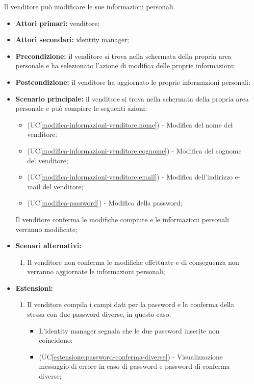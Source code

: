 Il venditore può modificare le sue informazioni personali.
\begin{itemize}
    \item \textbf{Attori primari:} venditore;
    \item \textbf{Attori secondari:} identity manager;
    \item \textbf{Precondizione:} il venditore si trova nella schermata della propria area personale e ha selezionato l'azione di modifica delle proprie informazioni;
    \item \textbf{Postcondizione:} il venditore ha aggiornato le proprie informazioni personali;
    \item \textbf{Scenario principale:} il venditore si trova nella schermata della propria area personale e può compiere le seguenti azioni:
    \begin{itemize}
    	\item (UC\ref{modifica-informazioni-venditore.nome}) - Modifica del nome del venditore;
    	\item (UC\ref{modifica-informazioni-venditore.cognome}) - Modifica del cognome del venditore;
        \item (UC\ref{modifica-informazioni-venditore.email}) - Modifica dell'indirizzo e-mail del venditore;
        \item (UC\ref{modifica-password}) - Modifica della password;
    \end{itemize}
    Il venditore conferma le modifiche compiute e le informazioni personali verranno modificate;
    \item \textbf{Scenari alternativi:}
    \begin{enumerate}[label=\lett]
    	\item Il venditore non conferma le modifiche effettuate e di conseguenza non verranno aggiornate le informazioni personali;
    \end{enumerate}
    \item \textbf{Estensioni:}
    \begin{enumerate}[label=\lett]
    	\item Il venditore compila i campi dati per la password e la conferma della stessa con due password diverse, in questo caso:
    	\begin{itemize}
    		\item L'identity manager segnala che le due password inserite non coincidono;
    		\item (UC\ref{estensione:password-conferma-diverse}) - Visualizzazione messaggio di errore in caso di password e password di conferma diverse;

\end{itemize}
\end{enumerate}
\end{itemize}

